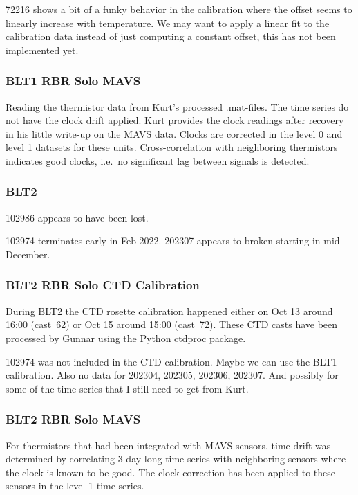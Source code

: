 \documentclass[10pt,letterpaper]{article}
\newcommand{\clink}[2]{{\color{modblue2} \href{#1}{#2}}}
\begin{document}
72216 shows a bit of a funky behavior in the calibration where the offset seems to linearly increase with temperature. We may want to apply a linear fit to the calibration data instead of just computing a constant offset, this has not been implemented yet.

\subsubsection*{BLT1 RBR Solo MAVS}
\label{sub:blt1_rbr_solo_mavs}
Reading the thermistor data from Kurt's processed .mat-files. The time series do not have the clock drift applied. Kurt provides the clock readings after recovery in his little write-up on the MAVS data. Clocks are corrected in the level 0 and level 1 datasets for these units. Cross-correlation with neighboring thermistors indicates good clocks, i.e.~no significant lag between signals is detected. 


\subsubsection*{BLT2}
\label{sub:rbr_blt2}
102986 appears to have been lost.

102974 terminates early in Feb 2022.
202307 appears to broken starting in mid-December.

\subsubsection*{BLT2 RBR Solo CTD Calibration}
\label{sub:blt2_rbr_ctd_calibration}

During BLT2 the CTD rosette calibration happened either on Oct 13 around 16:00 (cast~62) or Oct 15 around 15:00 (cast~72). These CTD casts have been processed by Gunnar using the Python \clink{https://ctdproc.readthedocs.io/en/latest/}{ctdproc} package.

102974 was not included in the CTD calibration. Maybe we can use the BLT1 calibration. Also no data for 202304, 202305, 202306, 202307. And possibly for some of the time series that I still need to get from Kurt.

\subsubsection*{BLT2 RBR Solo MAVS}
\label{sub:blt2_rbr_solo_mavs}
For thermistors that had been integrated with MAVS-sensors, time drift was determined by correlating 3-day-long time series with neighboring sensors where the clock is known to be good. The clock correction has been applied to these sensors in the level 1 time series.
\end{document}
